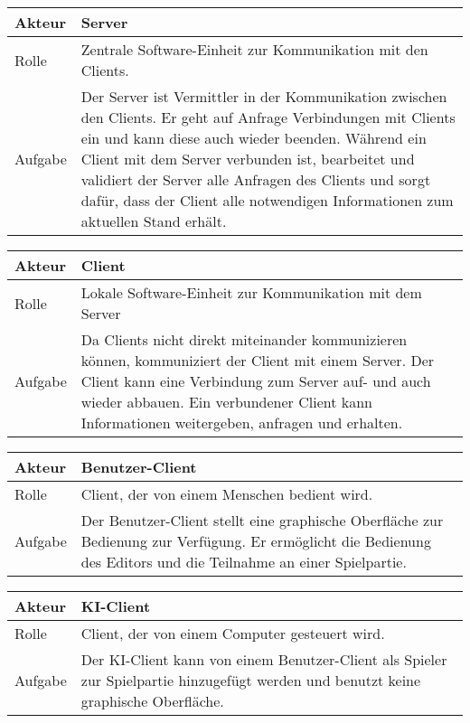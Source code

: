 
\begin{tabularx}{16cm}{l|X}
	\textbf{Akteur} & \textbf{Server} \\
	\hline
	Rolle & Zentrale Software-Einheit zur Kommunikation mit den Clients.\\ 
	\hline
	Aufgabe & Der Server ist Vermittler in der Kommunikation zwischen den Clients. Er geht auf Anfrage Verbindungen mit Clients ein und kann diese auch wieder beenden. Während ein Client mit dem Server verbunden ist, bearbeitet und validiert der Server alle Anfragen des Clients und sorgt dafür, dass der Client alle notwendigen Informationen zum aktuellen Stand erhält.\\ 
\end{tabularx}

\begin{tabularx}{16cm}{l|X}
	\textbf{Akteur} & \textbf{Client} \\
	\hline
	Rolle & Lokale Software-Einheit zur Kommunikation mit dem Server \\ 
	\hline
	Aufgabe & Da Clients nicht direkt miteinander kommunizieren können, kommuniziert der Client mit einem Server. Der Client kann eine Verbindung zum Server auf- und auch wieder abbauen. Ein verbundener Client kann Informationen weitergeben, anfragen und erhalten.\\ 
\end{tabularx}

\begin{tabularx}{16cm}{l|X}
	\textbf{Akteur} & \textbf{Benutzer-Client} \\
	\hline
	Rolle & Client, der von einem Menschen bedient wird.\\ 
	\hline
	Aufgabe & Der Benutzer-Client stellt eine graphische Oberfläche zur Bedienung zur Verfügung. Er ermöglicht die Bedienung des Editors und die Teilnahme an einer Spielpartie.\\ 
\end{tabularx}

\begin{tabularx}{16cm}{l|X}
	\textbf{Akteur} & \textbf{KI-Client} \\
	\hline
	Rolle & Client, der von einem Computer gesteuert wird.\\ 
	\hline
	Aufgabe & Der KI-Client kann von einem Benutzer-Client als Spieler zur Spielpartie hinzugefügt werden und benutzt keine graphische Oberfläche.\\ 
\end{tabularx}

